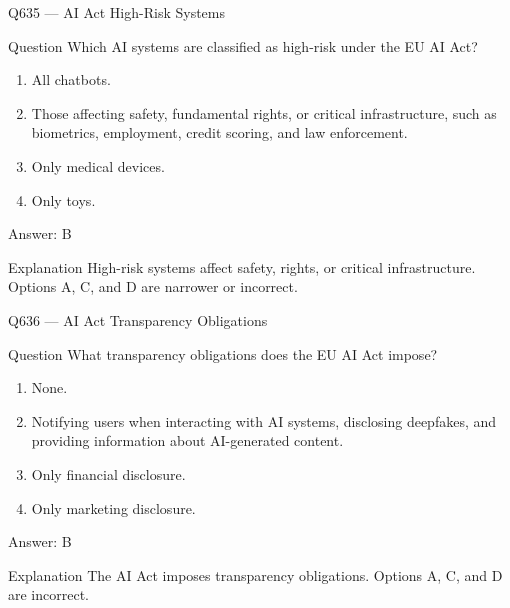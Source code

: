 \documentclass[aspectratio=169,8pt]{beamer}
\begin{document}
	\begin{frame}{Q635 --- AI Act High-Risk Systems}
		\begin{block}{Question}
			Which AI systems are classified as high-risk under the EU AI Act?
			\begin{enumerate}
				\item All chatbots.
				\item Those affecting safety, fundamental rights, or critical infrastructure, such as biometrics, employment, credit scoring, and law enforcement.
				\item Only medical devices.
				\item Only toys.
			\end{enumerate}
		\end{block}
		\begin{exampleblock}{Answer: B}\end{exampleblock}
		\begin{block}{Explanation}
			High-risk systems affect safety, rights, or critical infrastructure. Options A, C, and D are narrower or incorrect.
		\end{block}
	\end{frame}
	
	\begin{frame}{Q636 --- AI Act Transparency Obligations}
		\begin{block}{Question}
			What transparency obligations does the EU AI Act impose?
			\begin{enumerate}
				\item None.
				\item Notifying users when interacting with AI systems, disclosing deepfakes, and providing information about AI-generated content.
				\item Only financial disclosure.
				\item Only marketing disclosure.
			\end{enumerate}
		\end{block}
		\begin{exampleblock}{Answer: B}\end{exampleblock}
		\begin{block}{Explanation}
			The AI Act imposes transparency obligations. Options A, C, and D are incorrect.
		\end{block}
	\end{frame}
	
\end{document}
